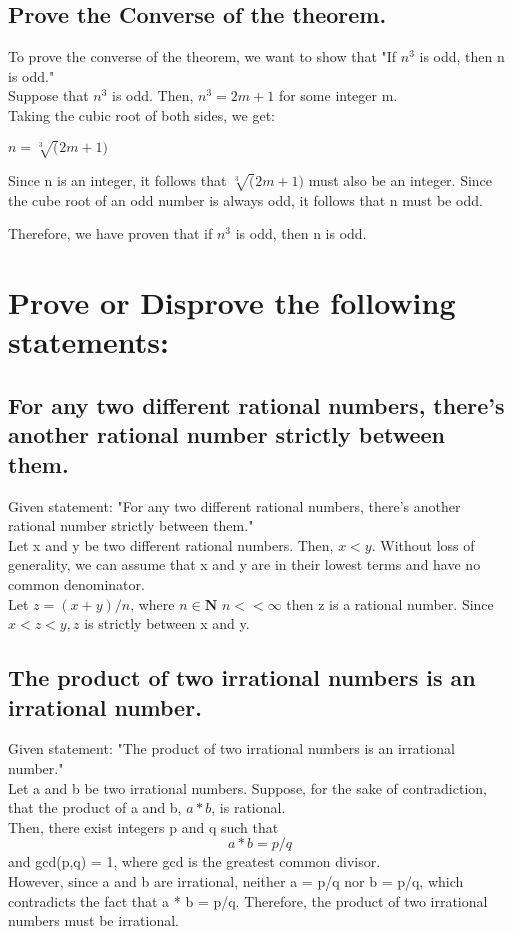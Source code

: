 \documentclass{article}
\begin{document}
\subsection{Prove the Converse of the theorem.}
\Large To prove the converse of the theorem, we want to show that "If $n^3$ is odd, then n is odd."\\

\Large Suppose that $n^3$ is odd. Then, $n^3 = 2m + 1$ for some integer m.\\

Taking the cubic root of both sides, we get:

$n = \sqrt[3](2m + 1)$

Since n is an integer, it follows that $\sqrt[3](2m + 1)$ must also be an integer. Since the cube root of an odd number is always odd, it follows that n must be odd.

Therefore, we have proven that if $n^3$ is odd, then n is odd.
\\

\section{Prove or Disprove the following statements:}
\subsection{For any two different rational numbers, there’s another rational number strictly between
them.}
\Large Given statement: "For any two different rational numbers, there’s another rational number strictly between
them."
\\
\Large Let x and y be two different rational numbers. Then, $x < y$. Without loss of generality, we can assume that x and y are in their lowest terms and have no common denominator. \\
Let $z = (x + y)/n$, where $n\in \mathbf{N}$  $ n<<\infty$ then z is a rational number. Since $x < z < y, z$ is strictly between x and y.\\

\subsection{The product of two irrational numbers is an irrational number.}
\Large Given statement: "The product of two irrational numbers is an irrational number."
\\
\Large Let a and b be two irrational numbers. Suppose, for the sake of contradiction, that the product of a and b, $a * b$, is rational.\\
\Large Then, there exist integers p and q such that$$ a * b = p/q$$ and gcd(p,q) = 1, where gcd is the greatest common divisor.\\
\Large However, since a and b are irrational, neither a = p/q nor b = p/q, which contradicts the fact that a * b = p/q. Therefore, the product of two irrational numbers must be irrational.\\
\end{document}
